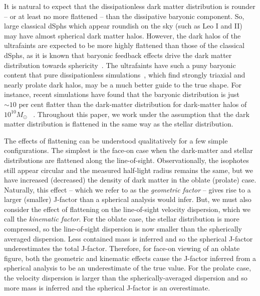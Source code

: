 \documentclass[prd,twocolumn,showpacs,preprintnumbers,superscriptaddress,nofootinbib,amsmath,amssymb,nobalancelastpage]{revtex4}
\def\percent{\text{ per cent}}
\def\percent{\text{ per cent}}
\begin{document}
It is natural to expect that the dissipationless
dark matter distribution is rounder -- or at least no more flattened
-- than the dissipative baryonic component. So, large classical dSphs
which appear roundish on the sky (such as Leo I and II) may have
almost spherical dark matter halos. However, the dark halos of the ultrafaints are expected to be more
highly flattened than those of the classical dSphs, as it is known
that baryonic feedback effects drive the dark matter distribution
towards sphericity~\citep{Ab10,Ze12}. The ultrafaints have such a puny
baryonic content that pure dissipationless
simulations~\citep{Ji02,Al06}, which find strongly triaxial and nearly
prolate dark halos, may be a much better guide to the true shape. For instance, recent simulations have found that
the baryonic distribution is just $\sim10\percent$ flatter than the
dark-matter distribution for dark-matter halos of $10^{10} M_\odot$
~\citep{Tenneti2014}. Throughout this paper, we work under the assumption that the dark matter distribution is flattened in the same way as the stellar
distribution.

The effects of flattening can be understood qualitatively for a few
simple configurations. The simplest is the face-on case when the
dark-matter and stellar distributions are flattened along the
line-of-sight. Observationally, the isophotes still appear circular
and the measured half-light radius remains the same, but we have
increased (decreased) the density of dark matter in the oblate
(prolate) case. Naturally, this effect -- which we refer to as the
\emph{geometric factor} -- gives rise to a larger (smaller) J-factor
than a spherical analysis would infer. But, we must also consider the
effect of flattening on the line-of-sight velocity dispersion, which
we call the \emph{kinematic factor}. For the oblate case, the stellar
distribution is more compressed, so the line-of-sight dispersion is
now smaller than the spherically averaged dispersion. Less contained
mass is inferred and so the spherical J-factor underestimates the
total J-factor. Therefore, for face-on viewing of an oblate figure,
both the geometric and kinematic effects cause the J-factor inferred
from a spherical analysis to be an underestimate of the true value.
For the prolate case, the velocity dispersion is larger than the
spherically-averaged dispersion and so more mass is inferred and the
spherical J-factor is an overestimate.
\end{document}
